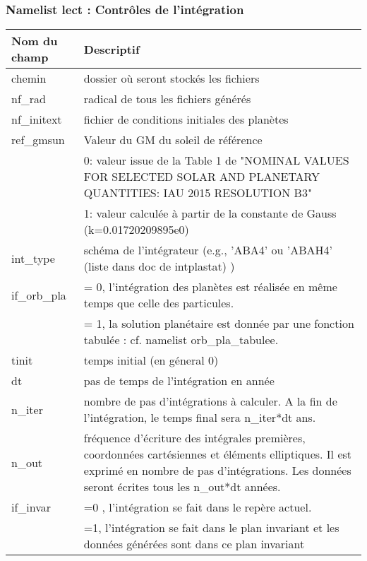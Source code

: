 \documentclass[11pt]{article}
\begin{document}
\subsubsection*{Namelist lect : Contr\^oles de l'int\'egration}

\begin{tabularx}{\textwidth}{|l|X|}
\hline
Nom du champ& Descriptif \\ \hline 
chemin   & dossier o\`u seront stock\'es les fichiers \\ \hline
 nf\_rad    & radical de tous les fichiers g\'en\'er\'es\\ \hline
 nf\_initext& fichier de conditions initiales des plan\`etes\\ \hline

 ref\_gmsun& Valeur du GM du soleil de r\'ef\'erence \\ 
& 0: valeur issue de la Table 1 de "NOMINAL VALUES FOR SELECTED SOLAR AND PLANETARY QUANTITIES: IAU 2015 RESOLUTION B3"\\
& 1: valeur calculée à partir de la constante de Gauss (k=0.01720209895e0) \\\hline

 int\_type& sch\'ema de l'int\'egrateur (e.g., 'ABA4' ou 'ABAH4' (liste dans doc de intplastat) ) \\ \hline

 if\_orb\_pla &  = 0, l'intégration des planètes est réalisée en même temps que celle des particules.\\
&  = 1, la solution planétaire est donnée par une fonction tabulée : cf. namelist orb\_pla\_tabulee.\\ \hline

 tinit & temps initial (en g\'eneral 0) \\ \hline

 dt& pas de temps de l'int\'egration en ann\'ee \\ \hline

 n\_iter& nombre de pas d'int\'egrations \`a calculer. A la fin de l'int\'egration, le temps final sera  n\_iter*dt ans.\\ \hline

 n\_out & fr\'equence d'\'ecriture des int\'egrales premi\`eres, coordonn\'ees cart\'esiennes et \'el\'ements elliptiques. Il est exprim\'e en nombre de pas d'int\'egrations. Les donn\'ees seront \'ecrites tous les n\_out*dt ann\'ees.
 \\ \hline
 if\_invar & =0 , l'int\'egration se fait dans le rep\`ere actuel. \\
& =1, l'int\'egration se fait dans le plan invariant et les donn\'ees g\'en\'er\'ees sont dans ce plan invariant 
\\ \hline


\end{tabularx}
\end{document}
